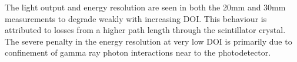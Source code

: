 The light output and energy resolution are seen in both the 20mm and 30mm measurements to degrade weakly with increasing DOI. This behaviour is attributed to losses from a higher path length through the scintillator crystal. The severe penalty in the energy resolution at very low DOI is primarily due to confinement of gamma ray photon interactions near to the photodetector.